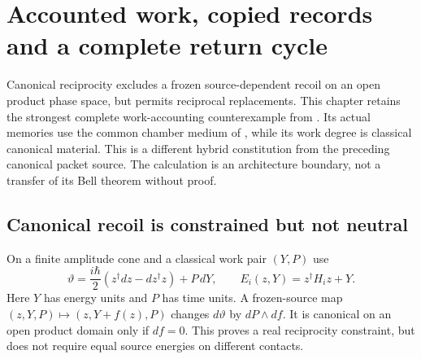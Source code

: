 \documentclass[11pt,oneside,openany]{book}
\theoremstyle{definition}
\theoremstyle{remark}\newtheorem{remark}[theorem]{Remark}
\begin{document}
\chapter{Accounted work, copied records and a complete return cycle}
\label{acc:work}

Canonical reciprocity excludes a frozen source-dependent recoil on an open
product phase space, but permits reciprocal replacements. This chapter
retains the strongest complete work-accounting counterexample from
\cite{M25}. Its actual memories use the common chamber medium of
\cite{M24}, while its work degree is classical canonical material. This
is a different hybrid constitution from the preceding canonical packet
source. The calculation is an architecture boundary, not a transfer of
its Bell theorem without proof.

\section{Canonical recoil is constrained but not neutral}
On a finite amplitude cone and a classical work pair $(Y,P)$ use
\[
\vartheta=\frac{i\hbar}{2}(z^\dagger dz-dz^\dagger z)+P\,dY,
 \qquad E_i(z,Y)=z^\dagger H_i z+Y.
\]
Here $Y$ has energy units and $P$ has time units. A frozen-source map
$(z,Y,P)\mapsto(z,Y+f(z),P)$ changes $d\vartheta$ by $dP\wedge df$.
It is canonical on an open product domain only if $df=0$. This proves a
real reciprocity constraint, but does not require equal source energies
on different contacts.
\end{document}
